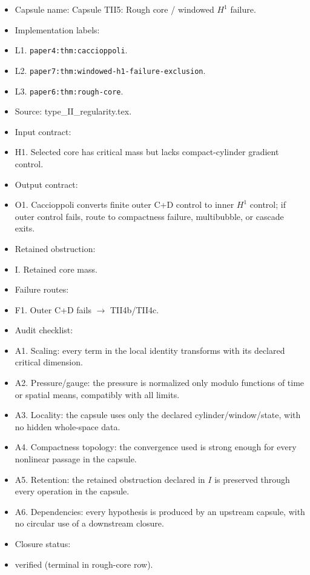 \documentclass[11pt]{amsart}
\begin{document}
\begin{itemize}
  \item Capsule name: Capsule TII5: Rough core / windowed $H^1$ failure.
  \item Implementation labels:
  \item L1. \texttt{paper4:thm:caccioppoli}.
  \item L2. \texttt{paper7:thm:windowed-h1-failure-exclusion}.
  \item L3. \texttt{paper6:thm:rough-core}.
  \item Source: type\_II\_regularity.tex.
  \item Input contract:
  \item H1. Selected core has critical mass but lacks compact-cylinder gradient control.
  \item Output contract:
  \item O1. Caccioppoli converts finite outer C+D control to inner $H^1$ control; if outer control fails, route to compactness failure, multibubble, or cascade exits.
  \item Retained obstruction:
  \item I. Retained core mass.
  \item Failure routes:
  \item F1. Outer C+D fails $\to$ TII4b/TII4c.
  \item Audit checklist:
  \item A1. Scaling: every term in the local identity transforms with its declared critical dimension.
  \item A2. Pressure/gauge: the pressure is normalized only modulo functions of time or spatial means, compatibly with all limits.
  \item A3. Locality: the capsule uses only the declared cylinder/window/state, with no hidden whole-space data.
  \item A4. Compactness topology: the convergence used is strong enough for every nonlinear passage in the capsule.
  \item A5. Retention: the retained obstruction declared in $I$ is preserved through every operation in the capsule.
  \item A6. Dependencies: every hypothesis is produced by an upstream capsule, with no circular use of a downstream closure.
  \item Closure status:
  \item verified (terminal in rough-core row).
\end{itemize}
\end{document}
